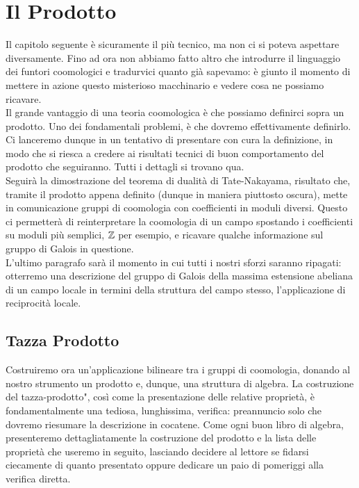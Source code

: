 \chapter{Il Prodotto}
Il capitolo seguente è sicuramente il più tecnico, ma non ci si poteva aspettare diversamente. Fino ad ora non abbiamo fatto altro che introdurre il linguaggio dei funtori coomologici e tradurvici quanto già sapevamo: è giunto il momento di mettere in azione questo misterioso macchinario e vedere cosa ne possiamo ricavare.\\

Il grande vantaggio di una teoria coomologica è che possiamo definirci sopra un prodotto. Uno dei fondamentali problemi, è che dovremo effettivamente definirlo. Ci lanceremo dunque in un tentativo di presentare con cura la definizione, in modo che si riesca a credere ai risultati tecnici di buon comportamento del prodotto che seguiranno. Tutti i dettagli si trovano qua. \todo[ref] \\

Seguirà la dimostrazione del teorema di dualità di Tate-Nakayama, risultato che, tramite il prodotto appena definito (dunque in maniera piuttosto oscura), mette in comunicazione gruppi di coomologia con coefficienti in moduli diversi. Questo ci permetterà di reinterpretare la coomologia di un campo spostando i coefficienti su moduli più semplici, $ \mathbb{Z} $ per esempio, e ricavare qualche informazione sul gruppo di Galois in questione. \\

L'ultimo paragrafo sarà il momento in cui tutti i nostri sforzi saranno ripagati: otterremo una descrizione del gruppo di Galois della massima estensione abeliana di un campo locale in termini della struttura del campo stesso, l'applicazione di reciprocità locale.

\section{Tazza Prodotto}
Costruiremo ora un'applicazione bilineare tra i gruppi di coomologia, donando al nostro strumento un prodotto e, dunque, una struttura di algebra. La costruzione del \leftquote tazza-prodotto", così come la presentazione delle relative proprietà, è fondamentalmente una tediosa, lunghissima, verifica: preannuncio solo che dovremo riesumare la descrizione in cocatene. Come ogni buon libro di algebra, presenteremo dettagliatamente la costruzione del prodotto e la lista delle proprietà che useremo in seguito, lasciando decidere al lettore se fidarsi ciecamente di quanto presentato oppure dedicare un paio di pomeriggi alla verifica diretta. \\

